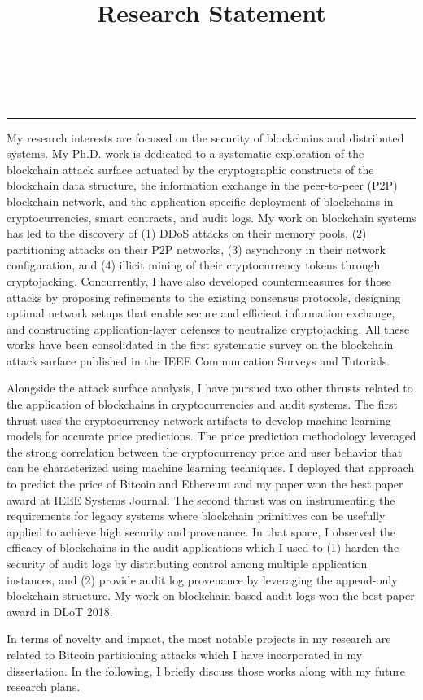\documentclass{NSF}
\begin{document}
\title{Research Statement}\\
\\\rule{\textwidth}{1.5pt}\vspace{3mm}

My research interests are focused on the security of blockchains and distributed systems. My Ph.D. work is dedicated to a systematic exploration of the blockchain attack surface actuated by the cryptographic constructs of the blockchain data structure, the information exchange in the peer-to-peer (P2P) blockchain network, and the application-specific deployment of blockchains in cryptocurrencies, smart contracts, and audit logs. My work on blockchain systems has led to the discovery of (1) DDoS attacks on their memory pools, (2) partitioning attacks on their P2P networks, (3) asynchrony in their network configuration, and (4) illicit mining of their cryptocurrency tokens through cryptojacking. Concurrently, I have also developed countermeasures for those attacks by proposing refinements to the existing consensus protocols, designing optimal network setups that enable secure and efficient information exchange, and constructing application-layer defenses to neutralize cryptojacking. All these works have been consolidated in the first systematic survey on the blockchain attack surface published in the IEEE Communication Surveys and Tutorials. 


Alongside the attack surface analysis, I have pursued two other thrusts related to the application of blockchains in cryptocurrencies and audit systems. The first thrust uses the cryptocurrency network artifacts to develop machine learning models for accurate price predictions. The price prediction methodology leveraged the strong correlation between the cryptocurrency price and user behavior that can be characterized using machine learning techniques. I deployed that approach to predict the price of Bitcoin and Ethereum and my paper won the best paper award at IEEE Systems Journal. The second thrust was on instrumenting the requirements for legacy systems where blockchain primitives can be usefully applied to achieve high security and provenance. In that space, I observed the efficacy of blockchains in the audit applications which I used to (1) harden the security of audit logs by distributing control among multiple application instances, and (2) provide audit log provenance by leveraging the append-only blockchain structure. My work on blockchain-based audit logs won the best paper award in DLoT 2018.   


In terms of novelty and impact, the most notable projects in my research are related to Bitcoin partitioning attacks which I have incorporated in my dissertation. In the following, I briefly discuss those works along with my future research plans. 
\end{document}
